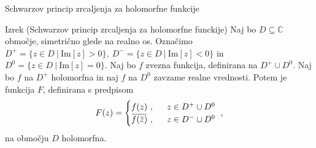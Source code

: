 \documentclass{beamer}
\newcommand{\overbar}[1]{\mkern 1.5mu\overline{\mkern-1.5mu#1\mkern-1.5mu}\mkern 1.5mu}
\theoremstyle{definition}
\theoremstyle{definition}
\begin{document}
\begin{frame}{Schwarzov princip zrcaljenja za holomorfne funkcije}
    \begin{exampleblock}{Izrek (Schwarzov princip zrcaljenja za holomorfne funckije)}
        Naj bo $D \subseteq \mathbb{C}$ območje, simetrično glede na realno os. 
        Označimo $D^{+} = \{z \in D~|~\text{Im}[z] > 0\},~D^{-} = \{z \in D~|~\text{Im}[z] < 0\}$ in $D^{0} = \{z \in D~|~\text{Im}[z] = 0\}$.
        Naj bo $f$ zvezna funkcija, definirana na $D^{+} \cup D^0$. Naj bo $f$ na $D^{+}$ holomorfna in naj $f$ na $D^0$ zavzame realne vrednosti.
        Potem je funkcija $F$, definirana s predpisom
        $$
        F(z) = 
        \begin{cases}
            f(z)~,~~&z \in D^{+} \cup D^0\\
            \overbar{f(\overbar{z})}~,~~&z \in D^{-} \cup D^0
        \end{cases}~,
        $$
        na območju $D$ holomorfna.
    \end{exampleblock}
\end{frame}


\end{document}
